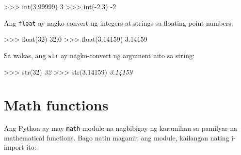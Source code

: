 \documentclass[10pt,]{book}
\newenvironment{Shaded}{}{}
\newcommand{\BuiltInTok}[1]{\textcolor[rgb]{0.00,0.50,0.00}{#1}}
\newcommand{\CommentTok}[1]{\textcolor[rgb]{0.38,0.63,0.69}{\textit{#1}}}
\newcommand{\DecValTok}[1]{\textcolor[rgb]{0.25,0.63,0.44}{#1}}
\newcommand{\FloatTok}[1]{\textcolor[rgb]{0.25,0.63,0.44}{#1}}
\newcommand{\NormalTok}[1]{#1}
\newcommand{\OperatorTok}[1]{\textcolor[rgb]{0.40,0.40,0.40}{#1}}
\newcommand{\StringTok}[1]{\textcolor[rgb]{0.25,0.44,0.63}{#1}}
\begin{document}
\begin{Shaded}
\begin{Highlighting}[]
\OperatorTok{\textgreater{}\textgreater{}\textgreater{}} \BuiltInTok{int}\NormalTok{(}\FloatTok{3.99999}\NormalTok{)}
\DecValTok{3}
\OperatorTok{\textgreater{}\textgreater{}\textgreater{}} \BuiltInTok{int}\NormalTok{(}\OperatorTok{{-}}\FloatTok{2.3}\NormalTok{)}
\OperatorTok{{-}}\DecValTok{2}
\end{Highlighting}
\end{Shaded}

Ang \texttt{float} ay nagko-convert ng integers at strings sa
floating-point numbers:

 

\begin{Shaded}
\begin{Highlighting}[]
\OperatorTok{\textgreater{}\textgreater{}\textgreater{}} \BuiltInTok{float}\NormalTok{(}\DecValTok{32}\NormalTok{)}
\FloatTok{32.0}
\OperatorTok{\textgreater{}\textgreater{}\textgreater{}} \BuiltInTok{float}\NormalTok{(}\StringTok{\textquotesingle{}3.14159\textquotesingle{}}\NormalTok{)}
\FloatTok{3.14159}
\end{Highlighting}
\end{Shaded}

Sa wakas, ang \texttt{str} ay nagko-convert ng argument nito sa string:

 

\begin{Shaded}
\begin{Highlighting}[]
\OperatorTok{\textgreater{}\textgreater{}\textgreater{}} \BuiltInTok{str}\NormalTok{(}\DecValTok{32}\NormalTok{)}
\CommentTok{\textquotesingle{}32\textquotesingle{}}
\OperatorTok{\textgreater{}\textgreater{}\textgreater{}} \BuiltInTok{str}\NormalTok{(}\FloatTok{3.14159}\NormalTok{)}
\CommentTok{\textquotesingle{}3.14159\textquotesingle{}}
\end{Highlighting}
\end{Shaded}

\section{Math functions}\label{math-functions}

  

Ang Python ay may \texttt{math} module na nagbibigay ng karamihan sa
pamilyar na mathematical functions. Bago natin magamit ang module,
kailangan nating i-import ito:
\end{document}
